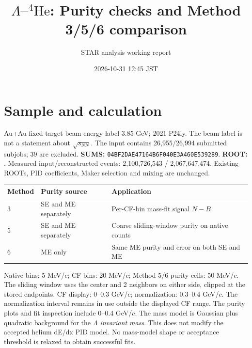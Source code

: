 \documentclass[10pt,a4paper]{article}
\title{$\Lambda$--$^{4}\mathrm{He}$: Purity checks and Method 3/5/6 comparison}
\author{STAR analysis working report}
\date{2026-10-31 12:45 JST}
\begin{document}
\maketitle
\section{Sample and calculation}
Au+Au fixed-target beam-energy label 3.85 GeV; 2021 P24iy. The beam label is not a statement about $\sqrt{s_{NN}}$. The input contains 26,955/26,994 submitted subjobs; 39 are excluded.
\textbf{SUMS:} \texttt{04BF2DAE47164B6F040E3A460E539289}. \textbf{ROOT:} .
Measured input/reconstructed events: 2,100,726,543 / 2,067,647,474. Existing ROOTs, PID coefficients, Maker selection and mixing are unchanged.
\begin{center}\begin{tabular}{lll}\toprule Method & Purity source & Application\\\midrule
3 & SE and ME separately & Per-CF-bin mass-fit signal $N-B$\\
5 & SE and ME separately & Coarse sliding-window purity on native counts\\
6 & ME only & Same ME purity and error on both SE and ME\\\bottomrule\end{tabular}\end{center}
Native bins: 5 MeV/$c$; CF bins: 20 MeV/$c$; Method 5/6 purity cells: 50 MeV/$c$. The sliding window uses the center and 2 neighbors on either side, clipped at the stored endpoints.
CF display: 0--0.3 GeV/$c$; normalization: 0.3--0.4 GeV/$c$. The normalization interval remains in use outside the displayed CF range. The purity plots and fit inspection include 0--0.4 GeV/$c$.
The mass model is Gaussian plus quadratic background for the \emph{$\Lambda$ invariant mass}. This does not modify the accepted helium dE/dx PID model. No mass-model shape or acceptance threshold is relaxed to obtain successful fits.
\end{document}
